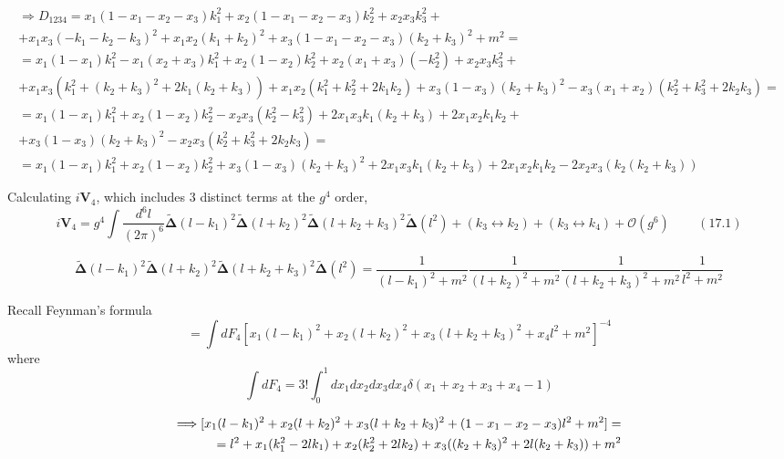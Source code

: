 \documentclass[twoside]{amsart}
\begin{document}
\[
\begin{gathered}
  \Longrightarrow D_{1234} = x_1 ( 1 - x_1 - x_2 - x_3) k_1^2  + x_2 ( 1 - x_1 - x_2 - x_3) k_2^2 + x_2 x_3 k_3^2 + \\
  + x_1 x_3(-k_1 - k_2 - k_3)^2 + x_1 x_2 (k_1 + k_2)^2 + x_3 ( 1 - x_1 - x_2 - x_3) (k_2 + k_3)^2 + m^2 = \\
  = x_1( 1 - x_1) k_1^2 - x_1(x_2 + x_3) k_1^2 + x_2 (1 - x_2) k_2^2 + x_2( x_1 + x_3) ( - k_2^2) + x_2 x_3 k_3^2 + \\
  + x_1 x_3(k_1^2 + (k_2+k_3)^2 + 2 k_1(k_2 + k_3)) + x_1 x_2( k_1^2 + k_2^2 + 2k_1 k_2) + x_3 (1-x_3)(k_2+k_3)^2 - x_3(x_1 + x_2) (k_2^2 + k_3^2 + 2k_2 k_3) = \\
  = x_1 ( 1 - x_1 )k_1^2 + x_2(1-x_2)k_2^2 - x_2 x_3 (k_2^2 - k_3^2)  + 2 x_1 x_3 k_1 (k_2 + k_3) + 2 x_1 x_2 k_1 k_2 + \\ 
  + x_3(1-x_3)(k_2 + k_3)^2 - x_2 x_3 ( k_2^2 + k_3^2 + 2k_2 k_3) = \\
  = x_1 ( 1 - x_1 )k_1^2 + x_2 (1-x_2)k_2^2 + x_3(1-x_3)(k_2 + k_3)^2  + 2 x_1 x_3 k_1(k_2 + k_3) + 2x_1 x_2 k_1 k_2 - 2x_2 x_3 (k_2 (k_2 + k_3))
\end{gathered}
\]

Calculating $i \mathbf{V}_4$, which includes 3 distinct terms at the $g^4$ order,
\[
i \mathbf{V}_4 = g^4 \int \frac{ d^6l}{ (2\pi)^6} \mathbf{\widetilde{\Delta}}(l - k_1)^2 \mathbf{\widetilde{\Delta}}(l+k_2)^2 \mathbf{\widetilde{\Delta}}(l+k_2 + k_3)^2 \mathbf{\widetilde{\Delta}}(l^2) + (k_3 \leftrightarrow k_2 ) + ( k_3 \leftrightarrow k_4) + \mathcal{O}(g^6) \quad \quad \, (17.1)
\] 

\[
\mathbf{\widetilde{\Delta}}(l - k_1)^2 \mathbf{\widetilde{\Delta}}(l+k_2)^2 \mathbf{\widetilde{\Delta}}(l+k_2 + k_3)^2 \mathbf{\widetilde{\Delta}}(l^2) = \frac{1}{ ( l-k_1)^2 + m^2 }  \frac{1}{ ( l+k_2)^2 + m^2 } \frac{1}{ ( l+k_2 +k_3)^2 + m^2 } \frac{1}{ l^2 + m^2 } 
\]

Recall Feynman's formula
\[
 = \int dF_4 [ x_1 (l-k_1)^2 + x_2 (l+k_2)^2 + x_3(l+k_2 + k_3)^2 + x_4 l^2 + m^2 ]^{-4} 
\]
where
\[
\int dF_4 = 3! \int_0^1 dx_1 dx_2 dx_3 dx_4 \delta(x_1 + x_2 + x_3 + x_4 -1 )
\]

\begin{align}
  \Longrightarrow [ x_1 ( l-k_1)^2 + x_2 ( l+k_2)^2 + x_3(l+k_2 + k_3)^2 + (1-x_1 - x_2 - x_3)l^2 + m^2 ] = \notag \\
  = l^2 + x_1 ( k_1^2 - 2lk_1) + x_2 (k_2^2 + 2lk_2) + x_3( (k_2+ k_3)^2 + 2l (k_2 +k_3) ) + m^2 \label{Eq:17.1-1pIvertex}
\end{align}
\end{document}
